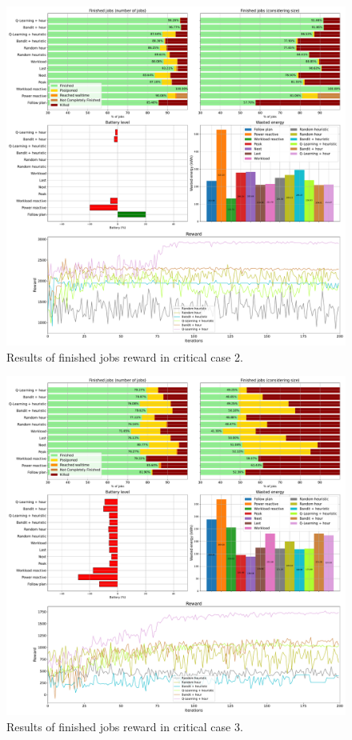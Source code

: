\begin{figure}[!htb]
    \centering
    \includegraphics[scale=0.29]{Images/Learning_compensations/reward_finished_touched_profile_best_workload_2_with_noise_state_delta.pdf}
    \caption{Results of finished jobs reward in critical case 2.}
    \label{fig:touched_reward_results_critical_2}
\end{figure}

\begin{figure}[!htb]
    \centering
    \includegraphics[scale=0.29]{Images/Learning_compensations/reward_finished_touched_profile_worst_workload_1_with_noise_state_delta.pdf}
    \caption{Results of finished jobs reward in critical case 3.}
    \label{fig:touched_reward_results_critical_3}
\end{figure}

